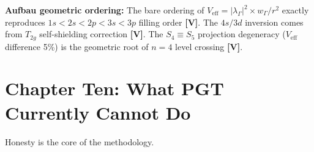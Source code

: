 \documentclass[11pt,a4paper]{article}
\newcommand{\gradeV}{\textbf{[V]}}
\begin{document}
\textbf{Aufbau geometric ordering:} The bare ordering of $V_{\mathrm{eff}} = |\lambda_\Gamma|^2\times w_\Gamma/r^2$ exactly reproduces $1s<2s<2p<3s<3p$ filling order \gradeV. The $4s/3d$ inversion comes from $T_{2g}$ self-shielding correction \gradeV. The $S_4\equiv S_5$ projection degeneracy ($V_{\mathrm{eff}}$ difference 5\%) is the geometric root of $n=4$ level crossing \gradeV.

\section{Chapter Ten: What PGT Currently Cannot Do}\label{sec:ch10}

Honesty is the core of the methodology.
\end{document}
